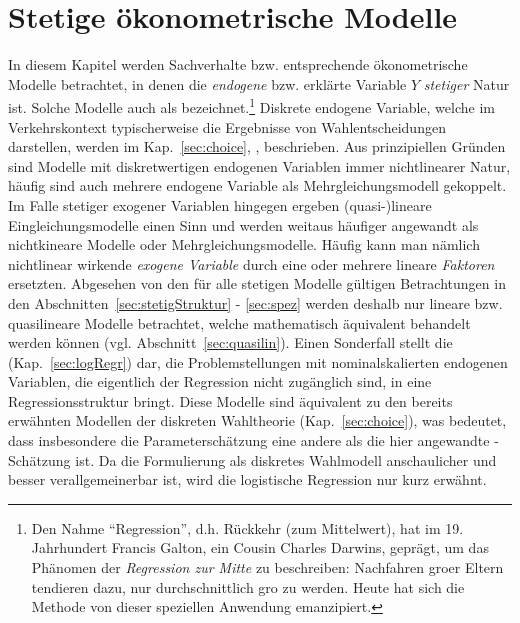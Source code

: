 


\chapter{\label{sec:regr}Stetige \"okonometrische Modelle}

In diesem Kapitel werden Sachverhalte bzw. entsprechende
\"okonometrische Modelle betrachtet, in denen die \emph{endogene} 
 bzw. erkl\"arte
Variable $Y$ \textit{stetiger} Natur ist. Solche Modelle
auch als  bezeichnet.\footnote{Den Nahme
 ``Regression'', d.h. R\"uckkehr (zum Mittelwert), 
   hat im 19. Jahrhundert
  Francis Galton, ein Cousin Charles Darwins, gepr\"agt, um das
  Ph\"anomen der \emph{Regression zur Mitte} zu beschreiben:
  Nachfahren gro\3er Eltern tendieren dazu, nur
  durchschnittlich gro\3 zu werden. Heute  hat sich die Methode von
  dieser speziellen Anwendung emanzipiert.}
Diskrete endogene
Variable, welche im Verkehrskontext typischerweise die Ergebnisse von
Wahlentscheidungen darstellen, werden im Kap.~\ref{sec:choice},
,
beschrieben. Aus prinzipiellen Gr\"unden sind Modelle mit
diskretwertigen endogenen Variablen immer nichtlinearer Natur,
h\"aufig sind auch mehrere endogene Variable als Mehrgleichungsmodell
gekoppelt. Im Falle stetiger
exogener Variablen hingegen ergeben 
(quasi-)lineare Eingleichungsmodelle einen Sinn
und werden weitaus h\"aufiger angewandt 
als nichtkineare Modelle oder Mehrgleichungsmodelle. H\"aufig kann man
n\"amlich nichtlinear wirkende \emph{exogene Variable} durch eine oder
mehrere lineare \emph{Faktoren} ersetzten. Abgesehen von den
 f\"ur alle stetigen Modelle
g\"ultigen Betrachtungen in den Abschnitten~\ref{sec:stetigStruktur} -
\ref{sec:spez} werden deshalb nur lineare bzw. quasilineare
Modelle betrachtet, welche mathematisch \"aquivalent behandelt
werden k\"onnen (vgl. Abschnitt~\ref{sec:quasilin}). Einen Sonderfall
stellt die  (Kap.~\ref{sec:logRegr})
dar, die Problemstellungen mit nominalskalierten endogenen Variablen,
die eigentlich der Regression nicht zug\"anglich sind, in eine
Regressionsstruktur bringt. Diese Modelle sind \"aquivalent zu den
bereits erw\"ahnten Modellen der  diskreten Wahltheorie
(Kap.~\ref{sec:choice}), was bedeutet, dass insbesondere die
Parametersch\"atzung eine andere als die hier angewandte -Sch\"atzung ist. Da die Formulierung als diskretes Wahlmodell
anschaulicher und besser verallgemeinerbar ist, wird die logistische
Regression nur kurz erw\"ahnt.
 
